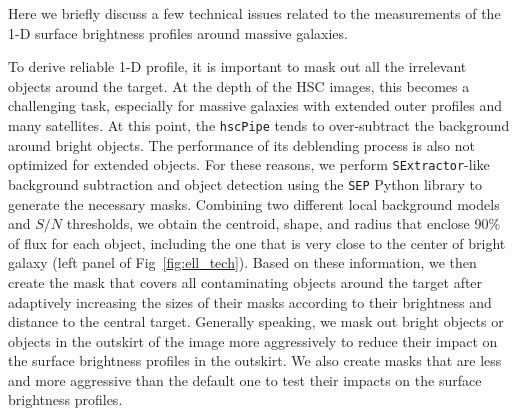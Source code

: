 \documentclass[a4paper,fleqn,usenatbib]{mnras}
\begin{document}
    Here we briefly discuss a few technical issues related to the measurements of the 
    1-D surface brightness profiles around massive galaxies. 
    
    To derive reliable 1-D profile, it is important to mask out all the irrelevant 
    objects around the target.
    At the depth of the HSC images, this becomes a challenging task, especially 
    for massive galaxies with extended outer profiles and many satellites. 
    At this point, the \texttt{hscPipe} tends to over-subtract the background around 
    bright objects.  
    The performance of its deblending process is also not optimized for extended
    objects. 
    For these reasons, we perform \texttt{SExtractor}-like background subtraction and 
    object detection using the \texttt{SEP} Python library to generate the necessary 
    masks.
    Combining two different local background models and $S/N$ thresholds, we obtain 
    the centroid, shape, and radius that enclose 90\% of flux for each object, 
    including the one that is very close to the center of bright galaxy (left panel of 
    Fig~\ref{fig:ell_tech}). 
    Based on these information, we then create the mask that covers all contaminating 
    objects around the target after adaptively increasing the sizes of their masks 
    according to their brightness and distance to the central target. 
    Generally speaking, we mask out bright objects or objects in the outskirt of the 
    image more aggressively to reduce their impact on the surface brightness profiles 
    in the outskirt. 
    We also create masks that are less and more aggressive than the default one to 
    test their impacts on the surface brightness profiles. 
    
\end{document}
